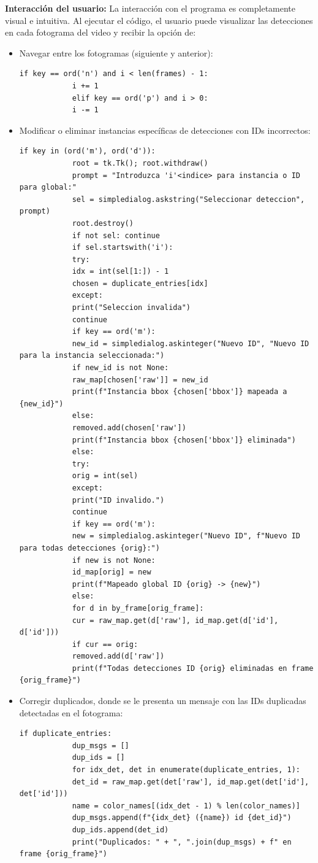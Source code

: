 \documentclass[12pt, a4paper, twoside]{article}
\begin{document}
	\textbf{Interacción del usuario:} La interacción con el programa es completamente visual e intuitiva. Al ejecutar el código, el usuario puede visualizar las detecciones en cada fotograma del video y recibir la opción de:
	
	\begin{itemize}
		\item Navegar entre los fotogramas (siguiente y anterior):
		\begin{lstlisting}[style=pythonstyle]
			if key == ord('n') and i < len(frames) - 1:
			i += 1
			elif key == ord('p') and i > 0:
			i -= 1
		\end{lstlisting}
		
		\item Modificar o eliminar instancias específicas de detecciones con IDs incorrectos:
		\begin{lstlisting}[style=pythonstyle]
			if key in (ord('m'), ord('d')):
			root = tk.Tk(); root.withdraw()
			prompt = "Introduzca 'i'<indice> para instancia o ID para global:"
			sel = simpledialog.askstring("Seleccionar deteccion", prompt)
			root.destroy()
			if not sel: continue
			if sel.startswith('i'):
			try:
			idx = int(sel[1:]) - 1
			chosen = duplicate_entries[idx]
			except:
			print("Seleccion invalida")
			continue
			if key == ord('m'):
			new_id = simpledialog.askinteger("Nuevo ID", "Nuevo ID para la instancia seleccionada:")
			if new_id is not None:
			raw_map[chosen['raw']] = new_id
			print(f"Instancia bbox {chosen['bbox']} mapeada a {new_id}")
			else:
			removed.add(chosen['raw'])
			print(f"Instancia bbox {chosen['bbox']} eliminada")
			else:
			try:
			orig = int(sel)
			except:
			print("ID invalido.")
			continue
			if key == ord('m'):
			new = simpledialog.askinteger("Nuevo ID", f"Nuevo ID para todas detecciones {orig}:")
			if new is not None:
			id_map[orig] = new
			print(f"Mapeado global ID {orig} -> {new}")
			else:
			for d in by_frame[orig_frame]:
			cur = raw_map.get(d['raw'], id_map.get(d['id'], d['id']))
			if cur == orig:
			removed.add(d['raw'])
			print(f"Todas detecciones ID {orig} eliminadas en frame {orig_frame}")
		\end{lstlisting}
		
		\item Corregir duplicados, donde se le presenta un mensaje con las IDs duplicadas detectadas en el fotograma:
		\begin{lstlisting}[style=pythonstyle]
			if duplicate_entries:
			dup_msgs = []
			dup_ids = []
			for idx_det, det in enumerate(duplicate_entries, 1):
			det_id = raw_map.get(det['raw'], id_map.get(det['id'], det['id']))
			name = color_names[(idx_det - 1) % len(color_names)]
			dup_msgs.append(f"{idx_det} ({name}) id {det_id}")
			dup_ids.append(det_id)
			print("Duplicados: " + ", ".join(dup_msgs) + f" en frame {orig_frame}")
		\end{lstlisting}
		

\end{itemize}
\end{document}

